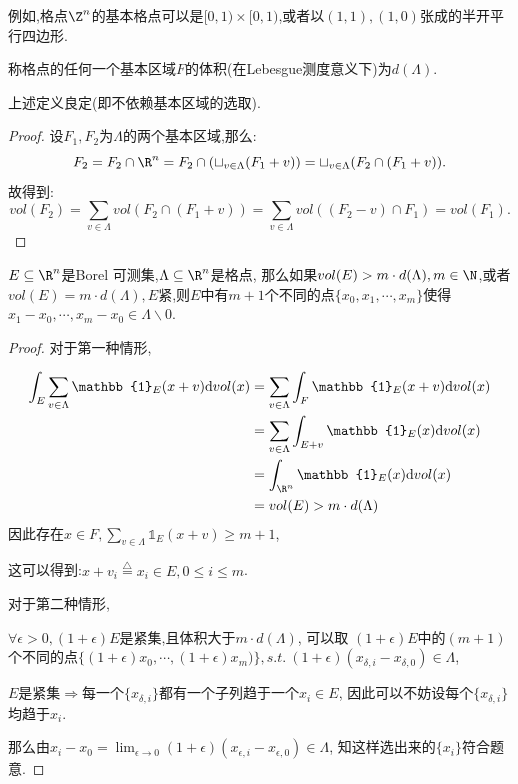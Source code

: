 例如,格点$\Z^n$的基本格点可以是$[0,1)\times [0,1)$,或者以$(1,1),(1,0)$张成的半开平行四边形.

\begin{definition}
    称格点的任何一个基本区域$F$的体积(在Lebesgue测度意义下)为$d(\Lambda)$.
\end{definition}
\begin{proposition}
    上述定义良定(即不依赖基本区域的选取).
\end{proposition}
\begin{proof}
    设$F_1,F_2$为$\Lambda$的两个基本区域,那么:
    $$F_2 = F_2 \cap \R^n = F_2 \cap (\sqcup_{v\in \Lambda}(F_1 + v)) = \sqcup_{v\in \Lambda}(F_2 \cap(F_1+v)).$$
    故得到:
    $$vol(F_2) = \sum_{v\in \Lambda} vol(F_2 \cap (F_1 + v)) = \sum_{v\in \Lambda}vol((F_2 - v) \cap F_1) = vol(F_1).$$

\end{proof}

\begin{theorem}[Blichfeldt 1914]
$E\subseteq \R^n$是Borel 可测集,$\Lambda \subseteq \R^n$是格点,
那么如果$vol(E) > m \cdot d(\Lambda),m\in \N$,或者$vol(E) = m\cdot d(\Lambda),E紧$,则$E$中有$m+1$个不同的点$\{ x_0, x_1, \cdots, x_m\}$使得$x_1- x_0, \cdots, x_m-x_0\in \Lambda \backslash 0$.
\end{theorem}
\begin{proof}
    对于第一种情形,

    \begin{align}
        \int_{E} \sum_{v\in\Lambda} \mathbb{1}_E(x+v)\mathrm{d} vol(x) &= \sum_{v\in\Lambda} \int_F \mathbb{1}_E(x+v)\mathrm{d} vol(x) \\
        & =\sum_{v\in\Lambda} \int_{E+v} \mathbb{1}_E(x)\mathrm{d} vol(x) \\
        & = \int_{\R^n} \mathbb{1}_E(x)\mathrm{d} vol(x) \\
        & = vol(E) > m \cdot d(\Lambda)
    \end{align}
    因此存在$x \in F, \sum_{v\in\Lambda} \mathbb{1}_E(x+v) \geq m+1 $,

    这可以得到:$x+v_i \stackrel{\triangle}{=} x_i \in E, 0\leq i \leq m$.

    对于第二种情形,

    $\forall \epsilon > 0, (1+\epsilon)E$是紧集,且体积大于$m\cdot d(\Lambda)$,
    可以取
    $(1+\epsilon)E$中的$(m+1)$个不同的点$\{(1+\epsilon) x_0, \cdots, (1+\epsilon)x_m)\},s.t. \ (1+\epsilon)(x_{\delta, i} - x_{\delta, 0})\in \Lambda$,

    $E$是紧集$\Rightarrow$每一个$\{x_{\delta,i}\}$都有一个子列趋于一个$x_i \in E$,
    因此可以不妨设每个$\{x_{\delta,i}\}$均趋于$x_i$.

    那么由$x_i - x_0 = \lim_{\epsilon \to 0}(1+\epsilon)(x_{\epsilon,i} - x_{\epsilon,0}) \in \Lambda$,
    知这样选出来的$\{x_i\}$符合题意.

\end{proof}

